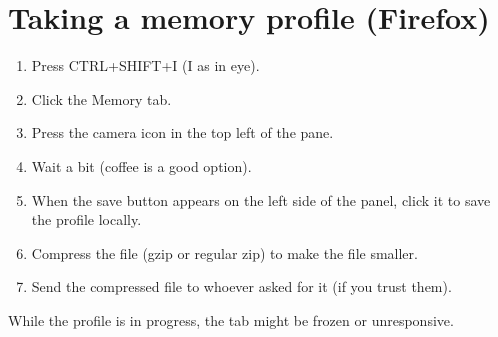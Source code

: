 \documentclass[letterpaper,10pt,openany,oneside,english]{sphinxmanual}
\begin{document}
\section{Taking a memory profile (Firefox)}
\label{\detokenize{memory-profiles-and-leaks:taking-a-memory-profile-firefox}}\begin{enumerate}
%
\item {} 
\sphinxAtStartPar
Press CTRL+SHIFT+I (I as in eye).

\item {} 
\sphinxAtStartPar
Click the Memory tab.

\item {} 
\sphinxAtStartPar
Press the camera icon in the top left of the pane.

\item {} 
\sphinxAtStartPar
Wait a bit (coffee is a good option).

\item {} 
\sphinxAtStartPar
When the save button appears on the left side of the panel, click it to save the
profile locally.

\item {} 
\sphinxAtStartPar
Compress the file (gzip or regular zip) to make the file smaller.

\item {} 
\sphinxAtStartPar
Send the compressed file to whoever asked for it (if you trust them).

\end{enumerate}

\sphinxAtStartPar
While the profile is in progress, the tab might be frozen or unresponsive.
\end{document}
